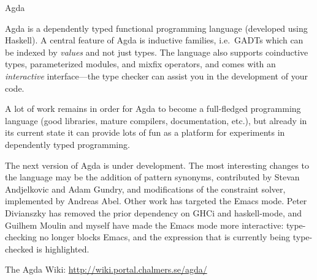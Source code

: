 \documentclass{article}
\begin{document}
\begin{hcarentry}{Agda}
\label{agda}
\makeheader

Agda is a dependently typed functional programming language (developed
using Haskell). A central feature of Agda is inductive families, i.e.\
GADTs which can be indexed by \emph{values} and not just types. The
language also supports coinductive types, parameterized modules, and
mixfix operators, and comes with an \emph{interactive} interface---the
type checker can assist you in the development of your code.

A lot of work remains in order for Agda to become a full-fledged
programming language (good libraries, mature compilers, documentation,
etc.), but already in its current state it can provide lots of fun as
a platform for experiments in dependently typed programming.

The next version of Agda is under development. The most interesting
changes to the language may be the addition of pattern synonyms,
contributed by Stevan Andjelkovic and Adam Gundry, and modifications
of the constraint solver, implemented by Andreas Abel. Other work has
targeted the Emacs mode. Peter Divianszky has removed the prior
dependency on GHCi and haskell-mode, and Guilhem Moulin and myself
have made the Emacs mode more interactive: type-checking no longer
blocks Emacs, and the expression that is currently being type-checked
is highlighted.

\FurtherReading
  The Agda Wiki: \url{http://wiki.portal.chalmers.se/agda/}
\end{hcarentry}
\end{document}

